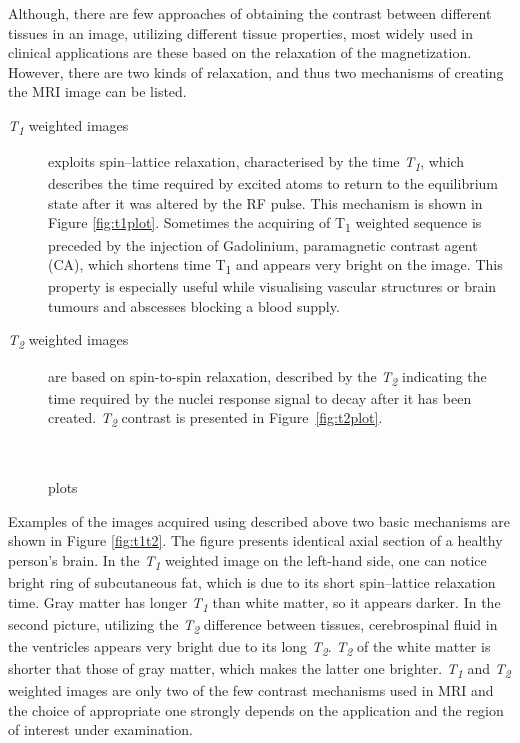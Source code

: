 Although, there are few approaches of obtaining the contrast between different tissues in an image, utilizing different tissue properties, most widely used in clinical applications are these based on the relaxation of the magnetization. However, there are two kinds of relaxation, and thus two mechanisms of creating the MRI image can be listed.
\begin{description}
		\item [\textit{T\textsubscript{1}} weighted images] exploits spin–lattice relaxation, characterised by the time \textit{T\textsubscript{1}}, which describes the time required by excited atoms to return to the equilibrium state after it was altered by the RF pulse. This mechanism is shown in Figure \ref{fig:t1plot}. Sometimes the acquiring of T\textsubscript{1} weighted sequence is preceded by the injection of Gadolinium, paramagnetic contrast agent (CA), which  shortens time {T\textsubscript{1}} and appears very bright on the image. This property is especially useful while visualising vascular structures or brain tumours and abscesses blocking a blood supply.   
		
		\item [\textit{T\textsubscript{2}} weighted images] are based on spin-to-spin relaxation, described by the \textit{T\textsubscript{2}} indicating the time required by the nuclei response signal to decay after it has been created. \textit{T\textsubscript{2}} contrast is presented in Figure~\ref{fig:t2plot}. 
\end{description}
\begin{figure}[H]
\captionsetup[subfloat]{captionskip=0.5cm}
	\centering
	\hspace{1.5cm}
	\\	
\vspace{0.5cm}
\caption{plots \cite{biomedical_hanbook_imaging}}
\label{fig:t1t2plot}
\end{figure}
Examples of the images acquired using described above two basic mechanisms are shown in Figure \ref{fig:t1t2}. 
The figure presents identical axial section of a healthy person's brain. In the \textit{T\textsubscript{1}} weighted  image on the left-hand side, one can notice bright ring of subcutaneous fat, which is due to its short spin–lattice relaxation time. Gray matter has longer \textit{T\textsubscript{1}} than white matter, so it appears darker. In the second picture, utilizing the \textit{T\textsubscript{2}} difference between tissues, cerebrospinal fluid in the ventricles appears very bright due to its long  \textit{T\textsubscript{2}}. \textit{T\textsubscript{2}} of the white matter is shorter that those of gray matter, which makes the latter one brighter. \textit{T\textsubscript{1}} and \textit{T\textsubscript{2}} weighted images are only two of the few contrast mechanisms used in  MRI and the choice of appropriate one strongly depends on the application and the region of interest under examination.

